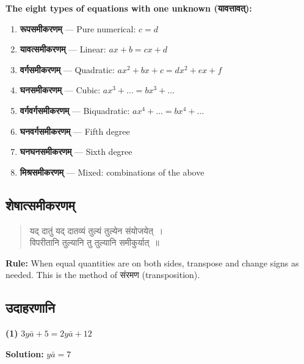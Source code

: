 \documentclass[11pt,a4paper]{article}
\newcommand{\dev}[1]{{\devanagarifont #1}}
\begin{document}
\vspace{0.3cm}

\textbf{The eight types of equations with one unknown (\dev{यावत्तावत्}):}

\begin{enumerate}[leftmargin=2em]
  \item \textbf{\dev{रूपसमीकरणम्}} --- Pure numerical: $c = d$
  \item \textbf{\dev{यावत्समीकरणम्}} --- Linear: $ax + b = cx + d$
  \item \textbf{\dev{वर्गसमीकरणम्}} --- Quadratic: $ax^2 + bx + c = dx^2 + ex + f$
  \item \textbf{\dev{घनसमीकरणम्}} --- Cubic: $ax^3 + \ldots = bx^3 + \ldots$
  \item \textbf{\dev{वर्गवर्गसमीकरणम्}} --- Biquadratic: $ax^4 + \ldots = bx^4 + \ldots$
  \item \textbf{\dev{घनवर्गसमीकरणम्}} --- Fifth degree
  \item \textbf{\dev{घनघनसमीकरणम्}} --- Sixth degree
  \item \textbf{\dev{मिश्रसमीकरणम्}} --- Mixed: combinations of the above
\end{enumerate}

\vspace{0.3cm}

\subsection*{\dev{शेषात्समीकरणम्}}

\begin{verse}
\devanagarifont
\centering
\color{versecolor}
\dev{यद् दातुं यद् दातव्यं तुल्यं तुल्येन संयोजयेत्~।}\\
\dev{विपरीतानि तुल्यानि तु तुल्यानि समीकुर्यात्~॥}
\end{verse}

\textbf{Rule:} When equal quantities are on both sides, transpose and change signs as needed. This is the method of \dev{संरमण} (transposition).

\vspace{0.3cm}

\subsection*{\dev{उदाहरणानि}}

\textbf{(1)} $3y\bar{a} + 5 = 2y\bar{a} + 12$

\textbf{Solution:} $y\bar{a} = 7$
\end{document}
